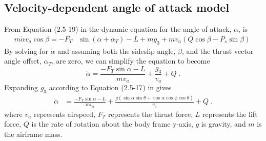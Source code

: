 \subsection{Velocity-dependent angle of attack model} \label{sec:alpha_derivation}
From Equation (2.5-19) in \cite{StevensLewis03} the dynamic equation for the angle of attack, $\alpha$, is
\begin{align}
m \dot{\alpha} v_a \cos\beta = -F_T &\sin(\alpha + \alpha_T) - L + mg_3 + mv_a(Q\cos\beta - P_s\sin\beta) \nonumber \;
\end{align}
By solving for $\dot{\alpha}$ and assuming both the sideslip angle, $\beta$, and the thrust vector angle offset, $\alpha_T$, are zero, we can simplify the equation to become
\begin{equation}
\dot{\alpha} = \frac{-F_T\sin\alpha - L}{mv_a} + \frac{g_3}{v_a} + Q \;.
\end{equation}
Expanding $g_3$ according to Equation (2.5-17) in \cite{StevensLewis03} gives
\begin{align}
\dot{\alpha} &= \frac{-F_T\sin\alpha - L}{mv_a} + \frac{g(\sin\alpha\sin\theta + \cos\alpha\cos\phi\cos\theta)}{v_a} + Q \nonumber \;.
\end{align}
where $v_a$ represents airspeed, $F_T$ represents the thrust force, $L$ represents the lift force, $Q$ is the rate of rotation about the body frame y-axis, $g$ is gravity, and $m$ is the airframe mass.

